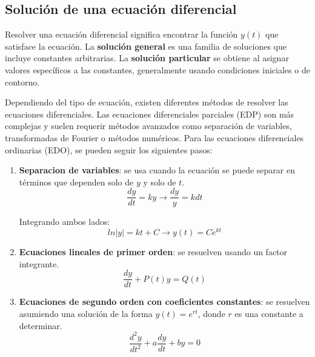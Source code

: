 \subsection{Solución de una ecuación diferencial}
Resolver una ecuación diferencial significa encontrar la función $y(t)$ que satisface la ecuación. La \textbf{solución general} es una familia de soluciones que incluye constantes arbitrarias. La \textbf{solución particular} se obtiene al asignar valores específicos a las constantes, generalmente usando condiciones iniciales o de contorno.

Dependiendo del tipo de ecuación, existen diferentes métodos de resolver las ecuaciones diferenciales. Las ecuaciones diferenciales parciales (EDP) son más complejas y suelen requerir métodos avanzados como separación de variables, transformadas de Fourier o métodos numéricos. Para las ecuaciones diferenciales ordinarias (EDO), se pueden seguir los siguientes pasos:
\begin{enumerate}
\item \textbf{Separacion de variables}: se usa cuando la ecuación se puede separar en términos que dependen solo de $y$ y solo de $t$.
$$\frac{dy}{dt} = ky \rightarrow \frac{dy}{y} = k dt$$

Integrando ambos lados:
$$ln |y| = kt + C \rightarrow y(t) = C e^{kt}$$

\item \textbf{Ecuaciones lineales de primer orden}: se resuelven usando un factor integrante.
$$\frac{dy}{dt} + P(t)y = Q(t)$$

\item \textbf{Ecuaciones de segundo orden con coeficientes constantes}: se resuelven asumiendo una solución de la forma $y(t) = e^{rt}$, donde $r$ es una constante a determinar.
$$\frac{d^2y}{dt^2} + a\frac{dy}{dt} + by = 0$$
\end{enumerate}
